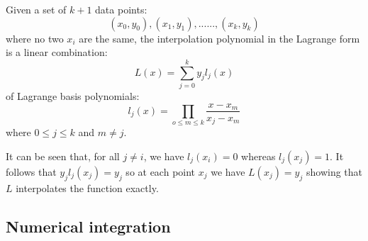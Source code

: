 Given a set of $k+1$ data points:
\begin{equation}
	(x_0,y_0), (x_1,y_1),... ..., (x_k,y_k)
\end{equation}
where no two $x_i$ are the same, the interpolation polynomial in the Lagrange form is a linear combination:
\begin{equation}
	L(x) = \sum_{j=0}^k y_j l_j(x)
\end{equation}
of Lagrange basis polynomials:
\begin{equation}
	l_j(x) = \prod_{o \leq m \leq k} \frac{x - x_m}{x_j - x_m}
\end{equation}
where $0 \leq j \leq k$ and $m \neq j$.

It can be seen that, for all $j \neq i$, we have $l_j(x_i) = 0$ whereas $l_j(x_j) = 1$. It follows that $y_j l_j(x_j) = y_j$ so at each point $x_j$ we have $L(x_j) = y_j$ showing that $L$ interpolates the function exactly.

\begin{center}
\begin{footnotesize}
\end{footnotesize}
\end{center}



\subsection{Numerical integration}
